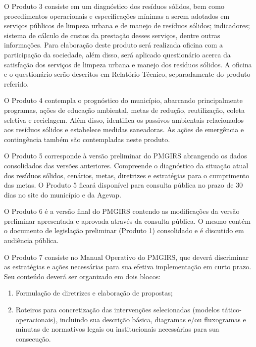 O Produto 3 consiste em um diagnóstico dos resíduos sólidos, bem como procedimentos operacionais e especificações mínimas a serem adotados em serviços públicos de limpeza urbana e de manejo de resíduos sólidos; indicadores; sistema de cálculo de custos da prestação desses serviços, dentre outras informações. Para elaboração deste produto será realizada oficina com a participação da sociedade, além disso, será aplicado questionário acerca da satisfação dos serviços de limpeza urbana e manejo dos resíduos sólidos. A oficina e o questionário serão descritos em Relatório Técnico, separadamente do produto referido.\vspace{1.5em}

O Produto 4 contempla o prognóstico do município, abarcando principalmente programas, ações de educação ambiental, metas de redução, reutilização, coleta seletiva e reciclagem. Além disso, identifica os passivos ambientais relacionados aos resíduos sólidos e estabelece medidas saneadoras. As ações de emergência e contingência também são contempladas neste produto.\vspace{1.5em}

O Produto 5 corresponde à versão preliminar do PMGIRS abrangendo os dados consolidados das versões anteriores. Compreende o diagnóstico da situação atual dos resíduos sólidos, cenários, metas, diretrizes e estratégias para o cumprimento das metas. O Produto 5 ficará disponível para consulta pública no prazo de 30 dias no site do município e da Agevap.\vspace{1.5em}

O Produto 6 é a versão final do PMGIRS contendo as modificações da versão preliminar apresentada e aprovada através da consulta pública. O mesmo contém o documento de legislação preliminar (Produto 1) consolidado e é discutido em audiência pública.\vspace{1.5em}

O Produto 7 consiste no Manual Operativo do PMGIRS, que deverá discriminar as estratégias e ações necessárias para sua efetiva implementação em curto prazo. Seu conteúdo deverá ser organizado em dois blocos:

\begin{enumerate}[label=\roman*]
	\item Formulação de diretrizes e elaboração de propostas; 
	\item Roteiros para concretização das intervenções selecionadas (modelos tático-operacionais), incluindo sua descrição básica, diagramas e/ou fluxogramas e minutas de normativos legais ou institucionais necessárias para sua consecução.
\end{enumerate}